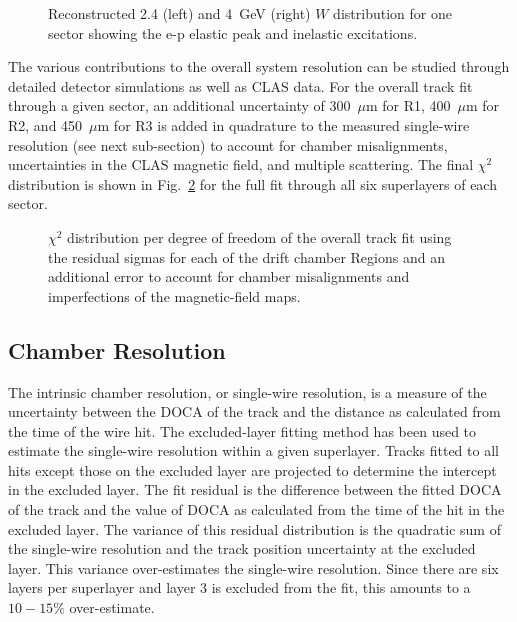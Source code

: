 \begin{figure}[htpb]
\vspace{5.5cm} 
\caption{\small{Reconstructed 2.4 (left) and 4~GeV (right) $W$ distribution for 
one sector showing the e-p elastic peak and inelastic excitations.}}
\label{elastic}
\end{figure}


The various contributions to the overall system resolution can be studied
through detailed detector simulations as well as CLAS data.  For the overall
track fit through a given sector, an additional uncertainty of 300~$\mu$m for 
R1, 400~$\mu$m for R2, and 450~$\mu$m for R3 is added in quadrature to the
measured single-wire resolution (see next sub-section) to account for chamber 
misalignments, uncertainties in the CLAS magnetic field, and multiple scattering.
The final $\chi^2$ distribution is shown in Fig.~\ref{chi2fit} for the 
full fit through all six superlayers of each sector.


\begin{figure}[htpb]
\vspace{5cm} 
\caption{\small{$\chi^2$ distribution per degree of freedom of the overall track 
fit using the residual sigmas for each of the drift chamber Regions and an 
additional error to account for chamber misalignments and imperfections of the
magnetic-field maps.}}
\label{chi2fit}
\end{figure}

\subsection{Chamber Resolution}

\hskip 0.15in
The intrinsic chamber resolution, or single-wire resolution, is a measure
of the uncertainty between the DOCA of the track and the distance as
calculated from the time of the wire hit.  The excluded-layer fitting method 
has been used to estimate the single-wire resolution within a given superlayer.  
Tracks fitted to all hits except those on the excluded layer are projected to 
determine the intercept in the excluded layer.  The fit residual is the difference 
between the fitted DOCA of the track and the value of DOCA as calculated from the 
time of the hit in the excluded layer.  The variance of this residual distribution 
is the quadratic sum of the single-wire resolution and the track position uncertainty 
at the excluded layer.  This variance over-estimates the single-wire resolution.
Since there are six layers per superlayer and layer 3 is excluded from the fit,
this amounts to a $10 - 15\%$ over-estimate.

